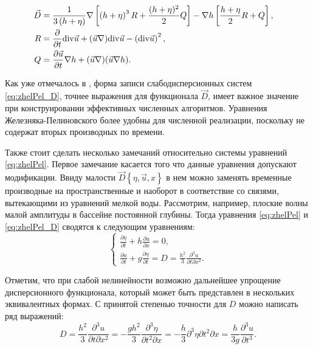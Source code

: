 \begin{align} \label{eq:zhelPel_D}
\vec{D}&=\frac{1}{3\left(h+\eta \right)} \nabla \left[\left(h+\eta \right)^{3} R+\frac{(h+\eta )^{2} }{2} Q\right]-\nabla h\left[\frac{h+\eta }{2} R+Q\right], &\notag\\
R&=\frac{\partial }{\partial t} {\rm div}\vec{u}+(\vec{u}\nabla ){\rm div}\vec{u}-\left({\rm div}\vec{u}\right)^{2}, &\\
Q&=\frac{\partial \vec{u}}{\partial t} \nabla h+(\vec{u}\nabla )(\vec{u}\nabla h). & \notag
\end{align}



Как уже отмечалось в \cite{Fedotova_2008}, форма записи слабодисперсионных систем \eqref{eq:zhelPel_D}, точнее выражения для функционала $\vec{D}$, имеет важное значение при конструировании эффективных численных алгоритмов. Уравнения Железняка-Пелиновского более удобны для численной реализации, поскольку не содержат вторых производных по времени.

Также стоит сделать несколько замечаний относительно системы уравнений \eqref{eq:zhelPel}. Первое замечание касается того что данные уравнения допускают модификации. Ввиду малости $\vec{D}\left\{\eta ,\vec{u},x\right\}$ в нем можно заменять временные производные на пространственные и наоборот в соответствие со связями, вытекающими из уравнений мелкой воды. Рассмотрим, например, плоские волны малой амплитуды в бассейне постоянной глубины. Тогда уравнения \eqref{eq:zhelPel} и \eqref{eq:zhelPel_D} сводятся к следующим уравнениям:
\begin{equation} \label{eq:zhelPel_MonoWave}
\begin{cases}
\frac{\partial \eta }{\partial t} +h\frac{\partial u}{\partial x}=0, \\
\frac{\partial u}{\partial t} + g\frac{\partial \eta}{\partial t}=D=\frac{h^2}{3}\frac{\partial^3u}{\partial t \partial x^2}.
\end{cases}
\end{equation}

Отметим, что при слабой нелинейности возможно дальнейшее упрощение дисперсионного функционала, который может быть представлен в нескольких эквивалентных формах. С принятой степенью точности для $D$ можно написать ряд выражений:
\begin{equation}\label{eq:zhelPel_MonoWaveD}
  D=\frac{h^2}{3}\frac{\partial^3u}{\partial t\partial x^2}=-\frac{gh^2}{3}\frac{\partial^3\eta}{\partial t^2\partial x}=-\frac{h}{3}{\partial^3\eta}{\partial t^2\partial x}=\frac{h}{3g}\frac{\partial^3u}{\partial t^3}.
\end{equation}

